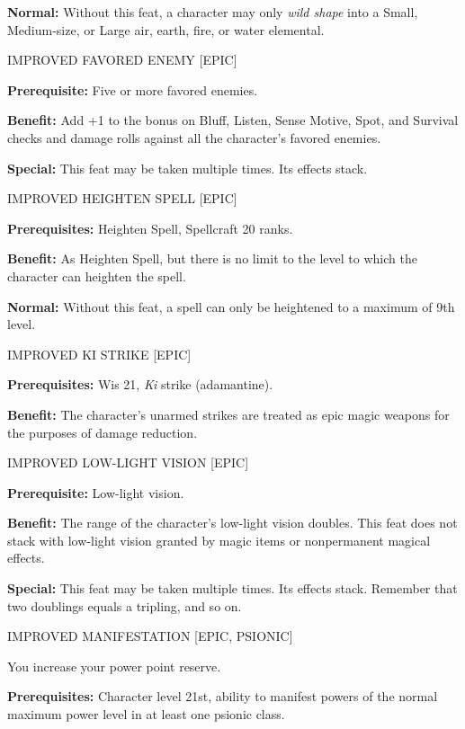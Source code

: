 \documentclass{article}
\begin{document}
\textbf{Normal:} Without this feat, a character may only \textit{wild shape }into 
a Small, Medium-size, or Large air, earth, fire, or water elemental. 

\vspace{12pt}
IMPROVED FAVORED ENEMY [EPIC] 

\textbf{Prerequisite:} Five or more favored enemies. 

\textbf{Benefit:} Add +1 to the bonus on Bluff, Listen, Sense Motive, Spot, and 
Survival checks and damage rolls against all the character's favored enemies. 

\textbf{Special:} This feat may be taken multiple times. Its effects stack. 

\vspace{12pt}
IMPROVED HEIGHTEN SPELL [EPIC] 

\textbf{Prerequisites:} Heighten Spell, Spellcraft 20 ranks. 

\textbf{Benefit:} As Heighten Spell, but there is no limit to the level to which 
the character can heighten the spell. 

\textbf{Normal:} Without this feat, a spell can only be heightened to a maximum 
of 9th level. 

\vspace{12pt}
IMPROVED KI STRIKE [EPIC] 

\textbf{Prerequisites:} Wis 21, \textit{Ki }strike (adamantine). 

\textbf{Benefit:} The character's unarmed strikes are treated as epic magic weapons 
for the purposes of damage reduction. 

\vspace{12pt}
IMPROVED LOW-LIGHT VISION [EPIC] 

\textbf{Prerequisite:} Low-light vision. 

\textbf{Benefit:} The range of the character's low-light vision doubles. This feat 
does not stack with low-light vision granted by magic items or nonpermanent magical 
effects. 

\textbf{Special:} This feat may be taken multiple times. Its effects stack. Remember 
that two doublings equals a tripling, and so on. 

\vspace{12pt}
IMPROVED MANIFESTATION [EPIC, PSIONIC]

You increase your power point reserve.

\textbf{Prerequisites:} Character level 21st, ability to manifest powers of the 
normal maximum power level in at least one psionic class.
\end{document}
